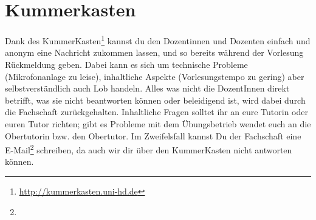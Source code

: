 \section{Kummerkasten}
\label{kummerkasten}

Dank des KummerKasten\footnote{\url{http://kummerkasten.uni-hd.de}} kannst du den Dozentinnen und Dozenten einfach und anonym eine Nachricht
zukommen lassen, und so bereits während der Vorlesung Rückmeldung geben. Dabei
kann es sich um technische Probleme (Mikrofonanlage zu leise), inhaltliche
Aspekte (Vorlesungstempo zu gering) aber selbstverständlich auch Lob handeln.
Alles was nicht die DozentInnen direkt betrifft, was sie nicht beantworten
können oder beleidigend ist, wird dabei durch die Fachschaft zurückgehalten.
Inhaltliche Fragen solltet ihr an eure Tutorin oder euren Tutor richten; gibt
es Probleme mit dem Übungsbetrieb wendet euch an die Obertutorin bzw. den
Obertutor. Im Zweifelsfall kannst Du der Fachschaft eine
E-Mail\footnote{} schreiben,
da auch wir dir über den KummerKasten nicht antworten können.
